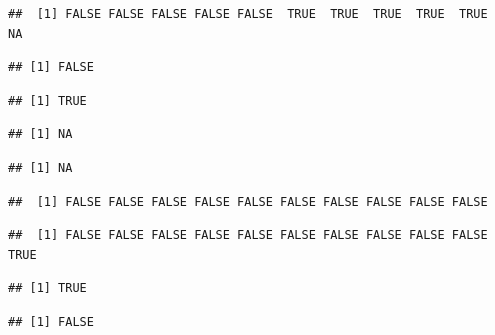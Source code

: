 \documentclass[krantz2]{krantz}\usepackage{knitr}
\begin{document}
\begin{knitrout}\footnotesize
{}\color{fgcolor}\begin{kframe}
\begin{alltt}
 \hlkwb{<-}  \hlstd{)}
 \hlopt{>} 
\end{alltt}
\begin{verbatim}
##  [1] FALSE FALSE FALSE FALSE FALSE  TRUE  TRUE  TRUE  TRUE  TRUE    NA
\end{verbatim}
\begin{alltt}
 \hlopt{>} \hlstd{)}
\end{alltt}
\begin{verbatim}
## [1] FALSE
\end{verbatim}
\begin{alltt}
 \hlopt{>} \hlstd{)}
\end{alltt}
\begin{verbatim}
## [1] TRUE
\end{verbatim}
\begin{alltt}
 \hlopt{<} \hlstd{)}
\end{alltt}
\begin{verbatim}
## [1] NA
\end{verbatim}
\begin{alltt}
 \hlopt{>} \hlstd{)}
\end{alltt}
\begin{verbatim}
## [1] NA
\end{verbatim}
\begin{alltt}
\end{alltt}
\begin{verbatim}
##  [1] FALSE FALSE FALSE FALSE FALSE FALSE FALSE FALSE FALSE FALSE
\end{verbatim}
\begin{alltt}
\end{alltt}
\begin{verbatim}
##  [1] FALSE FALSE FALSE FALSE FALSE FALSE FALSE FALSE FALSE FALSE  TRUE
\end{verbatim}
\begin{alltt}
\hlstd{(}
\end{alltt}
\begin{verbatim}
## [1] TRUE
\end{verbatim}
\begin{alltt}
\hlstd{(}
\end{alltt}
\begin{verbatim}
## [1] FALSE
\end{verbatim}
\end{kframe}
\end{knitrout}
\end{document}
